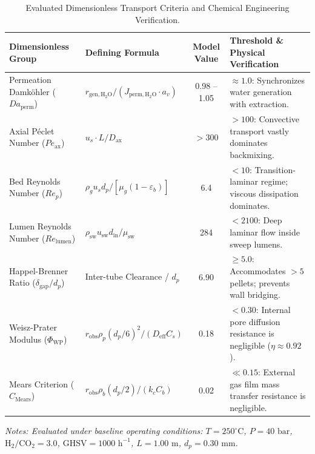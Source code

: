\documentclass[12pt,a4paper]{article}
\begin{document}
\begin{table}[htbp]
\centering
\caption{Evaluated Dimensionless Transport Criteria and Chemical Engineering Verification.}
\label{tab:dimensionless}
\begin{tabular*}{\textwidth}{@{\extracolsep{\fill}}llcl@{}}
\toprule
\textbf{Dimensionless Group} & \textbf{Defining Formula} & \textbf{Model Value} & \textbf{Threshold \& Physical Verification} \\
\midrule
Permeation Damk\"ohler ($Da_{\text{perm}}$) & $r_{\text{gen},\text{H}_2\text{O}} / (J_{\text{perm},\text{H}_2\text{O}} \cdot a_v)$ & 0.98 – 1.05 & $\approx 1.0$: Synchronizes water generation with extraction. \\
Axial P\'eclet Number ($Pe_{\text{ax}}$) & $u_s \cdot L / D_{\text{ax}}$ & $> 300$ & $> 100$: Convective transport vastly dominates backmixing. \\
Bed Reynolds Number ($Re_p$) & $\rho_g u_s d_p / [\mu_g (1 - \varepsilon_b)]$ & 6.4 & $< 10$: Transition-laminar regime; viscous dissipation dominates. \\
Lumen Reynolds Number ($Re_{\text{lumen}}$) & $\rho_{\text{sw}} u_{\text{sw}} d_{\text{in}} / \mu_{\text{sw}}$ & 284 & $< 2100$: Deep laminar flow inside sweep lumens. \\
Happel-Brenner Ratio ($\delta_{\text{gap}} / d_p$) & Inter-tube Clearance / $d_p$ & 6.90 & $\ge 5.0$: Accommodates $> 5$ pellets; prevents wall bridging. \\
Weisz-Prater Modulus ($\Phi_{\text{WP}}$) & $r_{\text{obs}} \rho_p (d_p/6)^2 / (D_{\text{eff}} C_s)$ & 0.18 & $< 0.30$: Internal pore diffusion resistance is negligible ($\eta \approx 0.92$). \\
Mears Criterion ($C_{\text{Mears}}$) & $r_{\text{obs}} \rho_b (d_p/2) / (k_c C_b)$ & 0.02 & $\ll 0.15$: External gas film mass transfer resistance is negligible. \\
\bottomrule
\end{tabular*}
\vspace{2pt}
{\raggedright\small\itshape Notes: Evaluated under baseline operating conditions: $T = 250^\circ\text{C}$, $P = 40\text{ bar}$, $\text{H}_2/\text{CO}_2 = 3.0$, $\text{GHSV} = 1000\text{ h}^{-1}$, $L = 1.00\text{ m}$, $d_p = 0.30\text{ mm}$.\par}
\end{table}

\end{document}

